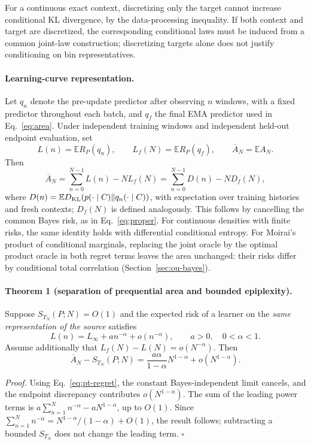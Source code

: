 \documentclass[10pt,a4paper]{article}
\theoremstyle{definition}
\begin{document}
For a continuous exact context, discretizing only the target cannot
increase conditional KL divergence, by the data-processing inequality.
If both context and target are discretized, the corresponding
conditional laws must be induced from a common joint-law construction;
discretizing targets alone does not justify conditioning on bin
representatives.

\paragraph{Learning-curve representation.}
Let $q_n$ denote the pre-update predictor after observing $n$ windows,
with a fixed predictor throughout each batch, and $q_f$ the final EMA
predictor used in Eq.~\eqref{eq:area}. Under independent training
windows and independent held-out endpoint evaluation, set
\[
 L(n)=\mathbb E R_P(q_n),\qquad L_f(N)=\mathbb E R_P(q_f),
 \qquad \overline A_N=\mathbb E A_N.
\]
Then
\begin{equation}
 \overline A_N=\sum_{n=0}^{N-1}L(n)-NL_f(N)
 =\sum_{n=0}^{N-1}D(n)-ND_f(N),
 \label{eq:pt-regret}
\end{equation}
where $D(n)=\mathbb E D_{\rm KL}(p(\cdot\mid C)\Vert
q_n(\cdot\mid C))$, with expectation over training histories and
fresh contexts; $D_f(N)$ is defined analogously.
This follows by cancelling the common Bayes risk, as in
Eq.~\eqref{eq:proper}. For continuous densities with finite risks,
the same identity holds with differential conditional entropy.
For Moirai's product of conditional marginals, replacing the joint
oracle by the optimal product oracle in both regret terms leaves
the area unchanged: their risks differ by conditional total
correlation (Section~\ref{sec:ou-bayes}).

\paragraph{Theorem 1 (separation of prequential area and bounded
epiplexity).}
Suppose $S_{T_N}(P;N)=O(1)$ and the expected risk of a learner on
the \emph{same representation of the source} satisfies
\[
 L(n)=L_\infty+a n^{-\alpha}+o(n^{-\alpha}),
 \qquad a>0,\quad 0<\alpha<1.
\]
Assume additionally that $L_f(N)-L(N)=o(N^{-\alpha})$.
Then
\begin{equation}
 \overline A_N-S_{T_N}(P;N)
 =\frac{a\alpha}{1-\alpha}N^{1-\alpha}
   +o(N^{1-\alpha}).
 \label{eq:pt-separation}
\end{equation}

\emph{Proof.}
Using Eq.~\eqref{eq:pt-regret}, the constant Bayes-independent
limit cancels, and the endpoint discrepancy contributes
$o(N^{1-\alpha})$. The sum of the leading power terms is
$a\sum_{n=1}^{N}n^{-\alpha}-aN^{1-\alpha}$, up to $O(1)$.
Since $\sum_{n=1}^N n^{-\alpha}=N^{1-\alpha}/(1-\alpha)+O(1)$,
the result follows; subtracting a bounded $S_{T_N}$ does not change
the leading term. \hfill$\square$
\end{document}
